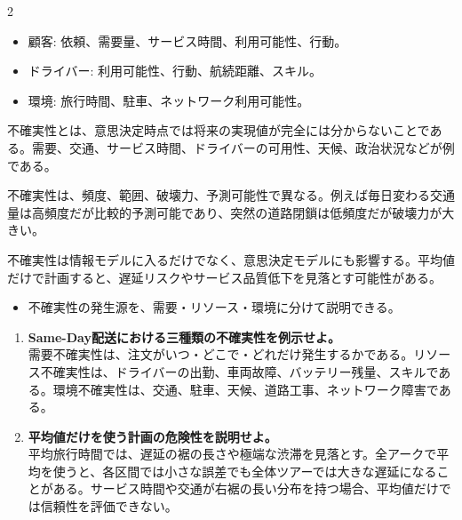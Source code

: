 \clearpage
{}
\begin{multicols}{2}\footnotesize\raggedcolumns
{}
\begin{itemize}
\item 顧客: 依頼、需要量、サービス時間、利用可能性、行動。
\item ドライバー: 利用可能性、行動、航続距離、スキル。
\item 環境: 旅行時間、駐車、ネットワーク利用可能性。
\end{itemize}
不確実性とは、意思決定時点では将来の実現値が完全には分からないことである。需要、交通、サービス時間、ドライバーの可用性、天候、政治状況などが例である。\par

不確実性は、頻度、範囲、破壊力、予測可能性で異なる。例えば毎日変わる交通量は高頻度だが比較的予測可能であり、突然の道路閉鎖は低頻度だが破壊力が大きい。\par

不確実性は情報モデルに入るだけでなく、意思決定モデルにも影響する。平均値だけで計画すると、遅延リスクやサービス品質低下を見落とす可能性がある。\par
{}
\begin{itemize}
\item 不確実性の発生源を、需要・リソース・環境に分けて説明できる。
\end{itemize}
\begin{enumerate}
\item \textbf{Same-Day配送における三種類の不確実性を例示せよ。}\\需要不確実性は、注文がいつ・どこで・どれだけ発生するかである。リソース不確実性は、ドライバーの出勤、車両故障、バッテリー残量、スキルである。環境不確実性は、交通、駐車、天候、道路工事、ネットワーク障害である。
\item \textbf{平均値だけを使う計画の危険性を説明せよ。}\\平均旅行時間では、遅延の裾の長さや極端な渋滞を見落とす。全アークで平均を使うと、各区間では小さな誤差でも全体ツアーでは大きな遅延になることがある。サービス時間や交通が右裾の長い分布を持つ場合、平均値だけでは信頼性を評価できない。
\end{enumerate}
\end{multicols}

